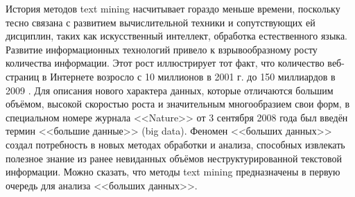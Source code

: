 История методов text mining насчитывает гораздо меньше времени, поскольку тесно связана с развитием вычислительной техники и сопутствующих ей дисциплин, таких как искусственный интеллект, обработка естественного языка. Развитие информационных технологий привело к взрывообразному росту количества информации. Этот рост иллюстрирует тот факт, что количество веб-страниц в Интернете возросло с 10 миллионов в 2001 г. до 150 миллиардов в 2009 \cite[стр. 4]{practical_tm}. Для описания нового характера данных, которые отличаются большим объёмом, высокой скоростью роста и значительным многообразием свои форм, в специальном номере журнала <<Nature>> от 3 сентября 2008 года был введён термин <<большие данные>> (big data). Феномен <<больших данных>> создал потребность в новых методах обработки и анализа, способных извлекать полезное знание из ранее невиданных объёмов неструктурированной текстовой информации. Можно сказать, что методы text mining предназначены в первую очередь для анализа <<больших данных>>.






